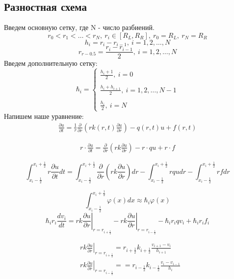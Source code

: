 \subsection{Разностная схема}
Введем основную сетку, где N - число разбиений.
\[ 
  r_0 < r_1 < \dots < r_N,\ r_i \in [R_L, R_R],\ r_0 = R_L,\ r_N = R_R
\]
\[
  h_i =r_i - r_{i-1},\ i=1,2, \dots, N
\]
\[
  r_{r-0.5} = \frac{r_i - r_{i-1}}{2},\ i=1,2, \dots, N
\]
Введем дополнительную сетку:
\[
  \hbar_i = \begin{cases}
    \frac{h_i + 1}{2},\ i = 0 \\ \\
    \frac{h_i + h_{i+1}}{2},\ i = 1, 2, \dots, N-1 \\ \\
    \frac{h_i}{2},\ i = N
  \end{cases}
\]
Напишем наше уравнение:
\begin{align*}
  \frac{\partial u}{\partial t} = \frac{1}{r} \frac{\partial}{\partial r}
  \left ( rk(r, t)\frac{\partial u}{\partial r} \right ) - q(r, t)u + f(r,t)
\end{align*}

\begin{align*}
  r \cdot \frac{\partial u}{\partial t} = \frac{\partial}{\partial r}
  \left ( rk\frac{\partial u}{\partial r} \right ) - r \cdot qu + r \cdot f
\end{align*}

\[
  \int^{x_i+\frac{1}{2}}_{x_i-\frac{1}{2}} r \frac{\partial u}{\partial t} dt =
  \int^{x_i+\frac{1}{2}}_{x_i-\frac{1}{2}} \frac{\partial}{\partial r} \left ( rk\frac{\partial u}{\partial r} \right ) dr
  - \int^{x_i+\frac{1}{2}}_{x_i-\frac{1}{2}} rqu dr - \int^{x_i+\frac{1}{2}}_{x_i-\frac{1}{2}} rf dr
\]

\[
  \int^{x_i+\frac{1}{2}}_{x_i-\frac{1}{2}} \varphi(x)dx \approx \hbar_i \varphi(x)
\]
\[
  \hbar_i r_i \frac{d v_i}{dt} = \left . rk \frac{\partial u}{\partial r} \right \vert_{r=r_{i+\frac{1}{2}}}
  - \left . rk \frac{\partial u}{\partial r} \right \vert_{r=r_{i-\frac{1}{2}}} -\hbar_i r_i q v_i + \hbar_i r_i f_i
\]

\begin{align*}
  &\left . rk \frac{\partial u}{\partial r} \right \vert_{r=r_{i+\frac{1}{2}}} = r_{i + \frac{1}{2}} k_{i + \frac{1}{2}} \frac{v_{i+1}-v_i}{h_{i + 1}} \\
  &\left . rk \frac{\partial u}{\partial r} \right \vert_{r=r_{i-\frac{1}{2}}} = = r_{i - \frac{1}{2}} k_{i - \frac{1}{2}} \frac{v_{i}-v_{i-1}}{h_{i}}
\end{align*}

